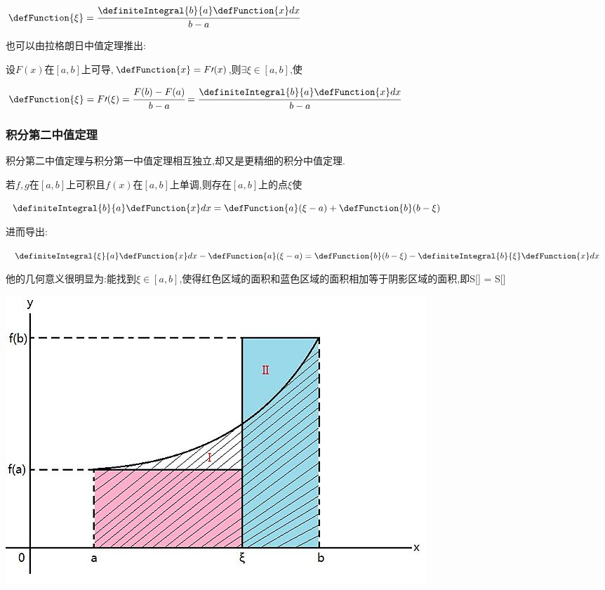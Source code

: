 {{{{$\defFunction{\xi} = \cfrac{\definiteIntegral{b}{a}\defFunction{x}dx}{b - a}$

也可以由拉格朗日中值定理推出:

设$F(x)$在$[a,b]$上可导,$\defFunction{x} = F\prime(x)$,则$\exists\xi\in[a,b]$,使

$\defFunction{\xi} = F\prime(\xi) = \cfrac{F(b) - F(a)}{b - a} = \cfrac{\definiteIntegral{b}{a}\defFunction{x}dx}{b - a}$

}%

\subsubsection{积分第二中值定理}{

积分第二中值定理与积分第一中值定理相互独立,却又是更精细的积分中值定理.

若$f,g$在$[a,b]$上可积且$f(x)$在$[a,b]$上单调,则存在$[a,b]$上的点$\xi$使

$\definiteIntegral{b}{a}\defFunction{x}dx = \defFunction{a}(\xi - a) + \defFunction{b}(b - \xi)$

进而导出:

$\definiteIntegral{\xi}{a}\defFunction{x}dx -\defFunction{a}(\xi - a) = \defFunction{b}(b - \xi) - \definiteIntegral{b}{\xi}\defFunction{x}dx$

他的几何意义很明显为:能找到$\xi\in[a,b]$,使得红色区域的面积和蓝色区域的面积相加等于阴影区域的面积,即S[\uppercase\expandafter{}] = S[\uppercase\expandafter{}]

\begin{center}
  \includegraphics{resources/Geometric_explanation_of_the_second_mean_value_theorem_for_integration.jpg}
\end{center}

}}}}
